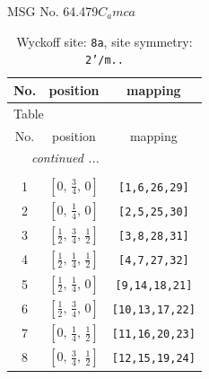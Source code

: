 \documentclass[fleqn,8pt]{jsarticle}
\begin{document}
\setcounter{MaxMatrixCols}{32}

\renewcommand{\tablename}{Table~}
\renewcommand{\figurename}{Figure~}
\begin{center}
\LARGE
MSG No. 64.479\quad$C_{a}mca$
\end{center}
\renewcommand{\arraystretch}{1.2}
\begin{longtable}{ccc}
\caption{Wyckoff site: {\tt 8a}, site symmetry: {\tt 2'/m..}}
 \\
 \hline \hline
No. & position & mapping \\ \hline \endfirsthead

\multicolumn{2}{l}{\tablename\ \thetable{}} \\
 \hline \hline
No. & position & mapping \\ \hline \endhead

 \hline \hline
\multicolumn{2}{r}{\footnotesize\it continued ...} \\ \endfoot

 \hline \hline
\multicolumn{2}{r}{} \\ \endlastfoot

1 & $\left[ 0,\, \frac{3}{4},\, 0 \right]$ & {\tt [1,6,26,29]} \\ \hline
2 & $\left[ 0,\, \frac{1}{4},\, 0 \right]$ & {\tt [2,5,25,30]} \\ \hline
3 & $\left[ \frac{1}{2},\, \frac{3}{4},\, \frac{1}{2} \right]$ & {\tt [3,8,28,31]} \\ \hline
4 & $\left[ \frac{1}{2},\, \frac{1}{4},\, \frac{1}{2} \right]$ & {\tt [4,7,27,32]} \\ \hline
5 & $\left[ \frac{1}{2},\, \frac{1}{4},\, 0 \right]$ & {\tt [9,14,18,21]} \\ \hline
6 & $\left[ \frac{1}{2},\, \frac{3}{4},\, 0 \right]$ & {\tt [10,13,17,22]} \\ \hline
7 & $\left[ 0,\, \frac{1}{4},\, \frac{1}{2} \right]$ & {\tt [11,16,20,23]} \\ \hline
8 & $\left[ 0,\, \frac{3}{4},\, \frac{1}{2} \right]$ & {\tt [12,15,19,24]} \\
\end{longtable}
\renewcommand{\arraystretch}{1.2}
\end{document}
